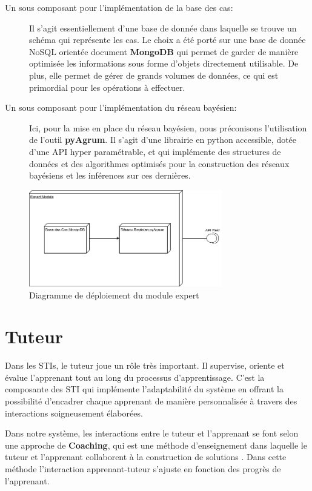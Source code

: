 \begin{description}
    \item[Un sous composant pour l'implémentation de la base des cas\cite{MongoDB}: ] Il s'agit essentiellement d'une base de donnée dans laquelle se trouve un schéma qui représente les cas. Le choix a été porté sur une base de donnée NoSQL orientée document \textbf{MongoDB} qui permet de garder de manière optimisée les informations sous forme d'objets directement utilisable. De plus, elle permet de gérer de grands volumes de données, ce qui est primordial pour les opérations à effectuer.
    \item[Un sous composant pour l'implémentation du réseau bayésien\cite{pyAgrum}: ] Ici, pour la mise en place du réseau bayésien, nous préconisons l'utilisation de l'outil \textbf{pyAgrum}. Il s'agit d'une librairie en python accessible, dotée d'une API hyper paramétrable, et qui implémente des structures de données et des algorithmes optimisés pour la construction des réseaux bayésiens et les inférences sur ces dernières.
\end{description}
\begin{figure}
    \centering
    \includegraphics[width=0.75\textwidth]{figures/deploy-expert.png}
    \captionsetup{justification=centering}
    \caption{Diagramme de déploiement du module expert}
    \label{fig:deploy}
\end{figure}
\newpage


\section{Tuteur}
Dans les STIs, le tuteur joue un rôle très important. Il supervise, oriente et évalue l'apprenant tout au long du processus d'apprentissage. C'est la composante des STI qui implémente l'adaptabilité du système en
offrant la possibilité d'encadrer chaque apprenant de manière personnalisée à travers des interactions soigneusement élaborées.

Dans notre système, les interactions entre le tuteur et l'apprenant se font selon une approche de \textbf{Coaching}, qui est une méthode d'enseignement dans laquelle le tuteur et l'apprenant collaborent à la construction de solutions \cite{vanlehn1996conceptual}. Dans cette méthode l'interaction apprenant-tuteur s'ajuste en fonction des progrès de l'apprenant. 

